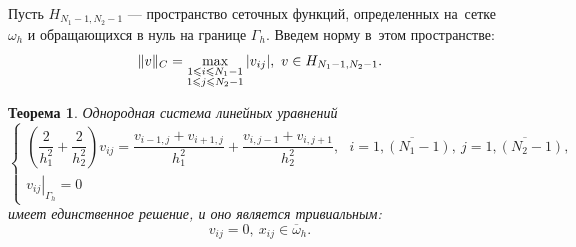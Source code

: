 \documentclass[11pt,a4paper,twoside,listtotoc,bibtotoc]{report}
\numberwithin{equation}{section}
\theoremstyle{definition}
\theoremstyle{plain}
\newtheorem{theorem}{Теорема}[section]
\DeclarePairedDelimiter\norm{\lVert}{\rVert}
\begin{document}
Пусть $H_{N_1-1, N_2-1}$ — пространство сеточных функций, определенных
на~сетке $\omega_h$ и обращающихся в нуль на границе $\Gamma_h$.
Введем норму в~этом пространстве:
    $$
        \norm{v}_C = \max_{\substack{1 \leqslant i \leqslant N_1 - 1\\
        1 \leqslant j \leqslant N_2 - 1}} |v_{ij}|,~v\in H_{N_1 - 1, N_2 - 1}.
    $$
%
\begin{theorem}
    Однородная система линейных уравнений
    $$
        \begin{cases}
            \left(\dfrac{2}{h_1^2} + \dfrac{2}{h_2^2}\right)v_{ij} =
                \dfrac{v_{i-1,j} + v_{i+1,j}}{h_1^2} +
                \dfrac{v_{i,j-1} + v_{i,j+1}}{h_2^2},~~~
            i=\overline{1,(N_1-1)},~j=\overline{1,(N_2-1)},\\
            \left.v_{ij}\right\vert_{\Gamma_h}=0
        \end{cases}
    $$
    имеет единственное решение, и оно является тривиальным:
    $$
        v_{ij} = 0,~x_{ij} \in \overline{\omega}_h.
    $$
\end{theorem}
%
%
\end{document}
